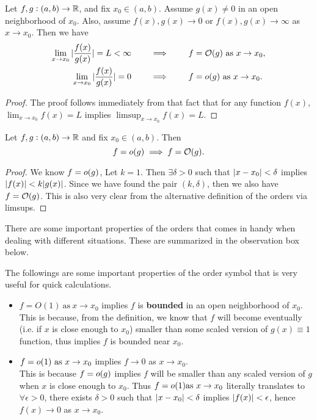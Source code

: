 \begin{corollary}
	Let $ f,g: (a,b) \to \mathbb{R} $, and fix $ x_0 \in (a,b) $. Assume $ g(x) \neq 0 $ in an open neighborhood of $ x_0 $. Also, assume $ f(x),g(x) \to 0 $ or $ f(x),g(x)\to\infty $ as $ x \to x_0 $. Then we have
	\begin{align*}
		 \lim_{x\to x_0}|\frac{f(x)}{g(x)}| = L < \infty \qquad &\implies \qquad f=\mathcal{O}(g)\ \text{as}\ x\to x_0,\\
		 \lim_{x\to x_0}|\frac{f(x)}{g(x)}| =0  \qquad &\implies \qquad f=o(g)\ \text{as}\ x\to x_0. 
	\end{align*}
\end{corollary}
\begin{proof}
	The proof follows immediately from that fact that for any function $ f(x) $, $ \lim_{x\to x_0}f(x) = L $ implies $ \limsup_{x\to x_0}f(x) = L  $. 
\end{proof}
\begin{corollary}
	Let $ f,g: (a,b)\to \mathbb{R} $ and fix $ x_0 \in (a,b) $. Then
	\[ f = o(g) \implies f = \mathcal{O}(g). \]
\end{corollary}
\begin{proof}
	We know $ f = o(g) $, Let $ k = 1 $. Then $ \exists \delta > 0 $ such that $ |x - x_0 | < \delta $ implies $ |f(x)| < k |g(x)| $. Since we have found the pair $ (k,\delta) $, then we also have $ f = \mathcal{O}(g) $. This is also very clear from the alternative definition of the orders via limsups. 
\end{proof}

There are some important properties of the orders that comes in handy when dealing with different situations. These are summarized in the observation box below.

\begin{observation}
	The followings are some important properties of the order symbol that is very useful for quick calculations.
	\begin{itemize}
		\item $ f = O(1)\ \text{as}\ x \to x_0 $ implies $ f $ is \textbf{bounded} in an open neighborhood of $ x_0 $. \\
		This is because, from the definition, we know that $ f $ will become eventually (i.e. if $ x $ is close enough to $ x_0 $) smaller than some scaled version of $ g(x) \equiv 1 $ function, thus implies $ f $ is bounded near $ x_0 $.
		\item $ f = o(1)\ \text{as}\ x \to x_0  $  implies $ f \to 0 $ as $ x \to x_0 $. \\
		This is because $ f = o(g) $ implies $ f $ will be smaller than any scaled version of $ g $ when $ x $ is close enough to $ x_0 $. Thus $ f = o(1) \text{as}\ x \to x_0  $ literally translates to $ \forall \epsilon>0 $, there exists $ \delta > 0 $ such that $ |x - x_0| < \delta $ implies $ |f(x)| < \epsilon $, hence $ f(x) \to 0 $ as $ x \to x_0 $.
	\end{itemize}
\end{observation}

